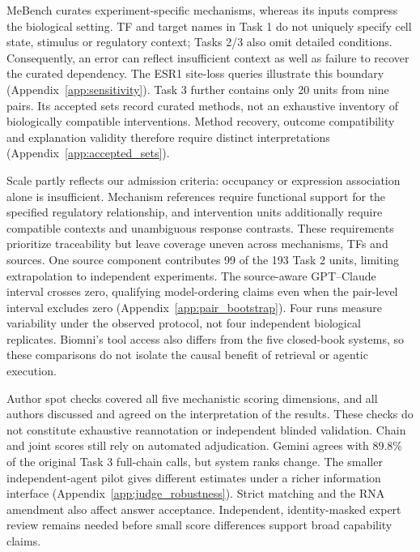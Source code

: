 MeBench curates experiment-specific mechanisms, whereas its inputs compress the biological setting. TF and target names in Task 1 do not uniquely specify cell state, stimulus or regulatory context; Tasks 2/3 also omit detailed conditions. Consequently, an error can reflect insufficient context as well as failure to recover the curated dependency. The ESR1 site-loss queries illustrate this boundary (Appendix~\ref{app:sensitivity}). Task 3 further contains only 20 units from nine pairs. Its accepted sets record curated methods, not an exhaustive inventory of biologically compatible interventions. Method recovery, outcome compatibility and explanation validity therefore require distinct interpretations (Appendix~\ref{app:accepted_sets}).

Scale partly reflects our admission criteria: occupancy or expression association alone is insufficient. Mechanism references require functional support for the specified regulatory relationship, and intervention units additionally require compatible contexts and unambiguous response contrasts. These requirements prioritize traceability but leave coverage uneven across mechanisms, TFs and sources. One source component contributes 99 of the 193 Task 2 units, limiting extrapolation to independent experiments. The source-aware GPT--Claude interval crosses zero, qualifying model-ordering claims even when the pair-level interval excludes zero (Appendix~\ref{app:pair_bootstrap}). Four runs measure variability under the observed protocol, not four independent biological replicates. Biomni's tool access also differs from the five closed-book systems, so these comparisons do not isolate the causal benefit of retrieval or agentic execution.

Author spot checks covered all five mechanistic scoring dimensions, and all authors discussed and agreed on the interpretation of the results. These checks do not constitute exhaustive reannotation or independent blinded validation. Chain and joint scores still rely on automated adjudication. Gemini agrees with 89.8\% of the original Task 3 full-chain calls, but system ranks change. The smaller independent-agent pilot gives different estimates under a richer information interface (Appendix~\ref{app:judge_robustness}). Strict matching and the RNA amendment also affect answer acceptance. Independent, identity-masked expert review remains needed before small score differences support broad capability claims.
